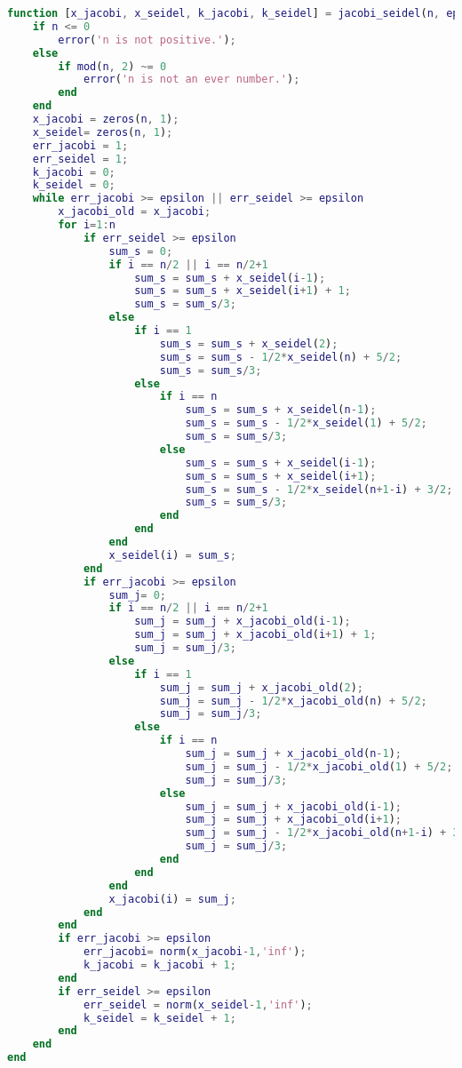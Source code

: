 \documentclass{article}
\begin{document}
        \begin{lstlisting}[language=Matlab]
function [x_jacobi, x_seidel, k_jacobi, k_seidel] = jacobi_seidel(n, epsilon)
    if n <= 0
        error('n is not positive.');
    else
        if mod(n, 2) ~= 0
            error('n is not an ever number.');
        end
    end
    x_jacobi = zeros(n, 1);
    x_seidel= zeros(n, 1);    
    err_jacobi = 1;
    err_seidel = 1;
    k_jacobi = 0;
    k_seidel = 0;
    while err_jacobi >= epsilon || err_seidel >= epsilon
        x_jacobi_old = x_jacobi;
        for i=1:n
            if err_seidel >= epsilon
                sum_s = 0;
                if i == n/2 || i == n/2+1
                    sum_s = sum_s + x_seidel(i-1);
                    sum_s = sum_s + x_seidel(i+1) + 1;
                    sum_s = sum_s/3;
                else
                    if i == 1
                        sum_s = sum_s + x_seidel(2);
                        sum_s = sum_s - 1/2*x_seidel(n) + 5/2;
                        sum_s = sum_s/3;
                    else
                        if i == n
                            sum_s = sum_s + x_seidel(n-1);
                            sum_s = sum_s - 1/2*x_seidel(1) + 5/2;
                            sum_s = sum_s/3;
                        else
                            sum_s = sum_s + x_seidel(i-1);
                            sum_s = sum_s + x_seidel(i+1);
                            sum_s = sum_s - 1/2*x_seidel(n+1-i) + 3/2;
                            sum_s = sum_s/3;
                        end
                    end
                end
                x_seidel(i) = sum_s;
            end
            if err_jacobi >= epsilon
                sum_j= 0;
                if i == n/2 || i == n/2+1
                    sum_j = sum_j + x_jacobi_old(i-1);
                    sum_j = sum_j + x_jacobi_old(i+1) + 1;
                    sum_j = sum_j/3;
                else
                    if i == 1
                        sum_j = sum_j + x_jacobi_old(2);
                        sum_j = sum_j - 1/2*x_jacobi_old(n) + 5/2;
                        sum_j = sum_j/3;
                    else
                        if i == n
                            sum_j = sum_j + x_jacobi_old(n-1);
                            sum_j = sum_j - 1/2*x_jacobi_old(1) + 5/2;
                            sum_j = sum_j/3;
                        else
                            sum_j = sum_j + x_jacobi_old(i-1);
                            sum_j = sum_j + x_jacobi_old(i+1);
                            sum_j = sum_j - 1/2*x_jacobi_old(n+1-i) + 3/2;
                            sum_j = sum_j/3;
                        end
                    end
                end
                x_jacobi(i) = sum_j;
            end
        end
        if err_jacobi >= epsilon
            err_jacobi= norm(x_jacobi-1,'inf');
            k_jacobi = k_jacobi + 1;
        end
        if err_seidel >= epsilon
            err_seidel = norm(x_seidel-1,'inf');
            k_seidel = k_seidel + 1;
        end
    end
end        
        \end{lstlisting}
\end{document}
